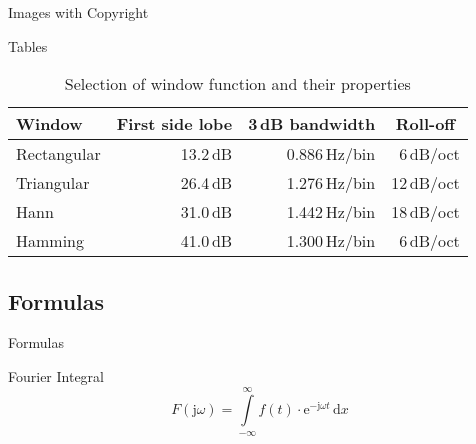\documentclass[compress,PxFont]{beamer}
\begin{document}
\begin{frame}{Images with Copyright}
	\begin{figure}
		\centering
	\end{figure}
\end{frame}


\begin{frame}{Tables}
\begin{table}[]
	\caption{Selection of window function and their properties}
	\begin{tabular}[]{lrrr}
		\toprule
		\textbf{Window}			& \multicolumn{1}{c}{\textbf{First side lobe}}	
		                    & \multicolumn{1}{c}{\textbf{3\,dB bandwidth}}
		                    & \multicolumn{1}{c}{\textbf{Roll-off}} \\
		\midrule
		Rectangular				& 13.2\,dB	& 0.886\,Hz/bin	& 6\,dB/oct		\\[0.25em]
		Triangular				& 26.4\,dB	& 1.276\,Hz/bin	& 12\,dB/oct	\\[0.25em]
		Hann					& 31.0\,dB	& 1.442\,Hz/bin	& 18\,dB/oct	\\[0.25em]
		Hamming					& 41.0\,dB	& 1.300\,Hz/bin	& 6\,dB/oct		\\
		\bottomrule
	\end{tabular}
	\label{tab:WindowFunctions}
\end{table}
\end{frame}


\subsection{Formulas}
\begin{frame}{Formulas}
\begin{block}{Fourier Integral}
\[
F(\textrm{j}\omega) = \displaystyle \int \limits_{-\infty}^{\infty} \! f(t)\cdot\textrm{e}^{-\textrm{j}\omega t}  \, \mathrm{d} x
\]
\end{block}
\end{frame}

\end{document}
